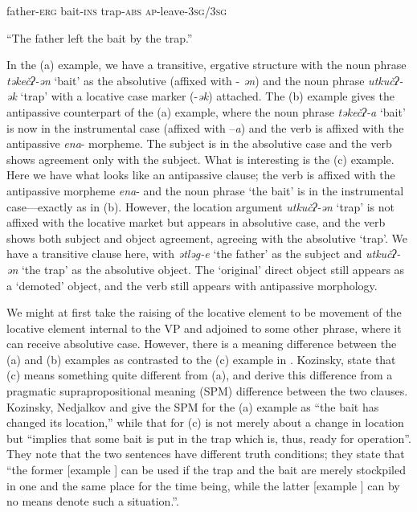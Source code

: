 \documentclass[output=paper,modfonts,nonflat]{langsci/langscibook}
\begin{document}
  father-\textsc{erg}  bait-\textsc{ins}  trap-\textsc{abs}  \textsc{ap}{}-leave-3\textsc{sg}/3\textsc{sg}

  “The father left the bait by the trap.”

In the (a) example, we have a transitive, ergative structure with the noun phrase \textit{təkečʔ-ən} ‘bait’ as the absolutive (affixed with - \textit{ən}) and the noun phrase \textit{utkučʔ-ək} ‘trap’ with a locative case marker (-\textit{ək}) attached.  The (b) example gives the antipassive counterpart of the (a) example, where the noun phrase \textit{təkečʔ-a} ‘bait’ is now in the instrumental case (affixed with –\textit{a}) and the verb is affixed with the antipassive \textit{ena}{}- morpheme.  The subject is in the absolutive case and the verb shows agreement only with the subject.  What is interesting is the (c) example.  Here we have what looks like an antipassive clause; the verb is affixed with the antipassive morpheme \textit{ena}{}- and the noun phrase ‘the bait’ is in the instrumental case—exactly as in (b).  However, the location argument \textit{utkučʔ-ən} ‘trap’ is not affixed with the locative market but appears in absolutive case, and the verb shows both subject and object agreement, agreeing with the absolutive ‘trap’. We have a transitive clause here, with \textit{ətləg-e} ‘the father’ as the subject and \textit{utkučʔ-ən} ‘the trap’ as the absolutive object.  The ‘original’ direct object still appears as a ‘demoted’ object, and the verb still appears with antipassive morphology. 

We might at first take the raising of the locative element to be movement of the locative element internal to the VP and adjoined to some other phrase, where it can receive absolutive case.  However, there is a meaning difference between the (a) and (b) examples as contrasted to the (c) example in .  Kozinsky, \citet{NedjalkovPolinskaja1988} state that (c) means something quite different from (a), and derive this difference from a pragmatic suprapropositional meaning (SPM) difference between the two clauses. Kozinsky, Nedjalkov and \citet[684]{Polinskaja1988} give the SPM for the (a) example as “the bait has changed its location,” while that for (c) is not merely about a change in location but “implies that some bait is put in the trap which is, thus, ready for operation”.  They note that the two sentences have different truth conditions; they state that “the former [example ] can be used if the trap and the bait are merely stockpiled in one and the same place for the time being, while the latter [example ] can by no means denote such a situation.”.  
\end{document}
